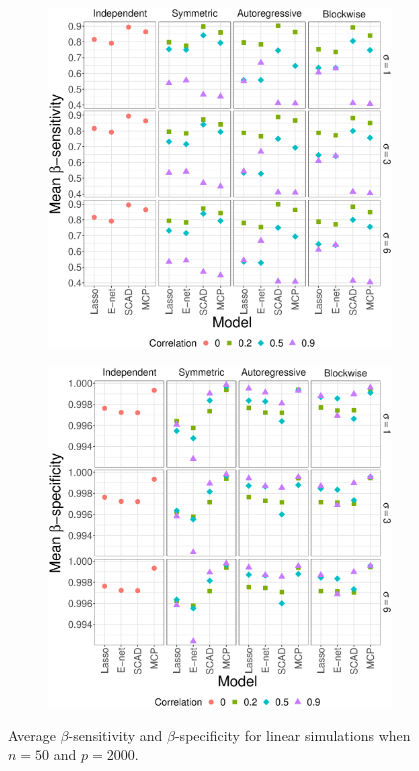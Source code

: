 \documentclass[final,onefignum,onetabnum]{siuro210301}
\begin{document}
	\begin{figure}[!htb]
		\centering
		\begin{subfigure}[b]{0.47\textwidth}
			\includegraphics[width=\textwidth]{images/facet/publication_facet_sensitivity_linear_50_2000.eps}
			\label{fig:linear-sensitivity}
		\end{subfigure}
		\hspace{6pt}
		\begin{subfigure}[b]{0.47\textwidth}
			\includegraphics[width=\textwidth]{images/facet/publication_facet_specificity_linear_50_2000.eps}
			\label{fig:linear-specificity}
		\end{subfigure}
		\caption{Average $\beta$-sensitivity and $\beta$-specificity for linear simulations when $n = 50$ and $p = 2000$.}
		\label{fig:linear-beta}
	\end{figure}
\end{document}
